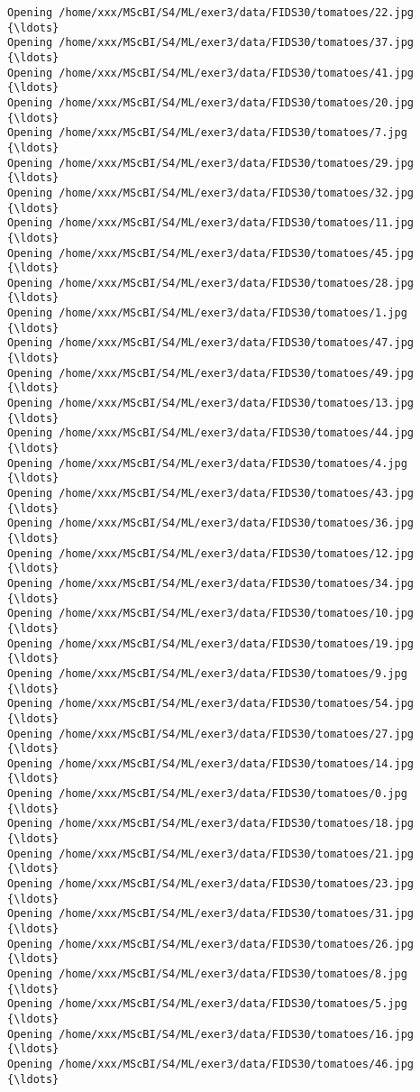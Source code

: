 \documentclass[11pt]{article}
\begin{document}
\begin{Verbatim}[commandchars=\\\{\}]
Opening /home/xxx/MScBI/S4/ML/exer3/data/FIDS30/tomatoes/22.jpg  {\ldots}
Opening /home/xxx/MScBI/S4/ML/exer3/data/FIDS30/tomatoes/37.jpg  {\ldots}
Opening /home/xxx/MScBI/S4/ML/exer3/data/FIDS30/tomatoes/41.jpg  {\ldots}
Opening /home/xxx/MScBI/S4/ML/exer3/data/FIDS30/tomatoes/20.jpg  {\ldots}
Opening /home/xxx/MScBI/S4/ML/exer3/data/FIDS30/tomatoes/7.jpg  {\ldots}
Opening /home/xxx/MScBI/S4/ML/exer3/data/FIDS30/tomatoes/29.jpg  {\ldots}
Opening /home/xxx/MScBI/S4/ML/exer3/data/FIDS30/tomatoes/32.jpg  {\ldots}
Opening /home/xxx/MScBI/S4/ML/exer3/data/FIDS30/tomatoes/11.jpg  {\ldots}
Opening /home/xxx/MScBI/S4/ML/exer3/data/FIDS30/tomatoes/45.jpg  {\ldots}
Opening /home/xxx/MScBI/S4/ML/exer3/data/FIDS30/tomatoes/28.jpg  {\ldots}
Opening /home/xxx/MScBI/S4/ML/exer3/data/FIDS30/tomatoes/1.jpg  {\ldots}
Opening /home/xxx/MScBI/S4/ML/exer3/data/FIDS30/tomatoes/47.jpg  {\ldots}
Opening /home/xxx/MScBI/S4/ML/exer3/data/FIDS30/tomatoes/49.jpg  {\ldots}
Opening /home/xxx/MScBI/S4/ML/exer3/data/FIDS30/tomatoes/13.jpg  {\ldots}
Opening /home/xxx/MScBI/S4/ML/exer3/data/FIDS30/tomatoes/44.jpg  {\ldots}
Opening /home/xxx/MScBI/S4/ML/exer3/data/FIDS30/tomatoes/4.jpg  {\ldots}
Opening /home/xxx/MScBI/S4/ML/exer3/data/FIDS30/tomatoes/43.jpg  {\ldots}
Opening /home/xxx/MScBI/S4/ML/exer3/data/FIDS30/tomatoes/36.jpg  {\ldots}
Opening /home/xxx/MScBI/S4/ML/exer3/data/FIDS30/tomatoes/12.jpg  {\ldots}
Opening /home/xxx/MScBI/S4/ML/exer3/data/FIDS30/tomatoes/34.jpg  {\ldots}
Opening /home/xxx/MScBI/S4/ML/exer3/data/FIDS30/tomatoes/10.jpg  {\ldots}
Opening /home/xxx/MScBI/S4/ML/exer3/data/FIDS30/tomatoes/19.jpg  {\ldots}
Opening /home/xxx/MScBI/S4/ML/exer3/data/FIDS30/tomatoes/9.jpg  {\ldots}
Opening /home/xxx/MScBI/S4/ML/exer3/data/FIDS30/tomatoes/54.jpg  {\ldots}
Opening /home/xxx/MScBI/S4/ML/exer3/data/FIDS30/tomatoes/27.jpg  {\ldots}
Opening /home/xxx/MScBI/S4/ML/exer3/data/FIDS30/tomatoes/14.jpg  {\ldots}
Opening /home/xxx/MScBI/S4/ML/exer3/data/FIDS30/tomatoes/0.jpg  {\ldots}
Opening /home/xxx/MScBI/S4/ML/exer3/data/FIDS30/tomatoes/18.jpg  {\ldots}
Opening /home/xxx/MScBI/S4/ML/exer3/data/FIDS30/tomatoes/21.jpg  {\ldots}
Opening /home/xxx/MScBI/S4/ML/exer3/data/FIDS30/tomatoes/23.jpg  {\ldots}
Opening /home/xxx/MScBI/S4/ML/exer3/data/FIDS30/tomatoes/31.jpg  {\ldots}
Opening /home/xxx/MScBI/S4/ML/exer3/data/FIDS30/tomatoes/26.jpg  {\ldots}
Opening /home/xxx/MScBI/S4/ML/exer3/data/FIDS30/tomatoes/8.jpg  {\ldots}
Opening /home/xxx/MScBI/S4/ML/exer3/data/FIDS30/tomatoes/5.jpg  {\ldots}
Opening /home/xxx/MScBI/S4/ML/exer3/data/FIDS30/tomatoes/16.jpg  {\ldots}
Opening /home/xxx/MScBI/S4/ML/exer3/data/FIDS30/tomatoes/46.jpg  {\ldots}

\end{Verbatim}
\end{document}

